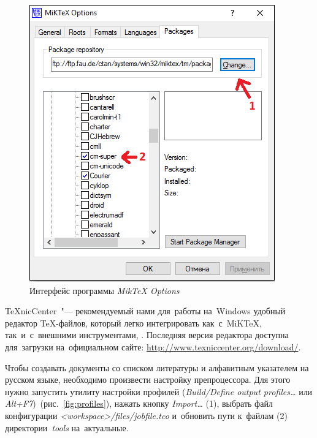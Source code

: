 \begin{figure}[h]
    \centering
    \includegraphics[scale = 1.0]{pictures/miktex.png}
    \caption{Интерфейс программы \emph{MikTeX Options}}
    \label{fig:miktex}
\end{figure}

\pagebreak


\TeX{}nicCenter~"--- рекомендуемый нами для~работы на~Windows удобный редактор \TeX-файлов, который легко интегрировать как~с~MiK\TeX{}, так~и~с~внешними инструментами, .
Последняя версия редактора доступна для~загрузки на~официальном сайте: \url{http://www.texniccenter.org/download/}.

Чтобы создавать документы со списком литературы и алфавитным указателем на русском языке, необходимо произвести настройку препроцессора.
Для этого нужно запустить утилиту настройки профилей (\emph{Build/Define output profiles\ldots} или \emph{Alt+F7})~(рис.~\ref{fig:profiles}), нажать кнопку \emph{Import\dots} (1), выбрать файл конфигурации \emph{<workspace>/files/jobfile.tco} и~обновить пути к~файлам (2) директории~\emph{tools} на~актуальные.

